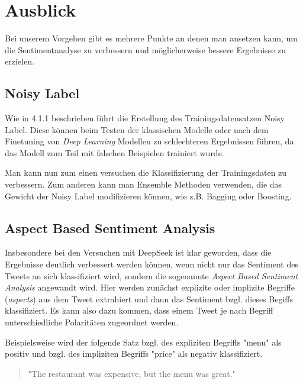 \section{Ausblick}


Bei unserem Vorgehen gibt es mehrere Punkte an denen man ansetzen kann, um die Sentimentanalyse zu verbessern und möglicherweise bessere Ergebnisse zu erzielen.

\subsection{Noisy Label}
Wie in 4.1.1 beschrieben führt die Erstellung des Trainingsdatensatzen Noisy Label. Diese können beim Testen der klassischen Modelle oder nach dem Finetuning von \textit{Deep Learning} Modellen zu schlechteren Ergebnissen führen, da das Modell zum Teil mit falschen Beispielen trainiert wurde. 

Man kann nun zum einen versuchen die Klassifizierung der Trainingsdaten zu verbessern.
Zum anderen kann man Ensemble Methoden verwenden, die das Gewicht der Noisy Label modifizieren können, wie z.B. Bagging oder Boosting.

\subsection{Aspect Based Sentiment Analysis}
Insbesondere bei den Versuchen mit DeepSeek ist klar geworden, dass die Ergebnisse deutlich verbessert werden können, wenn nicht nur das Sentiment des Tweets an sich klassifiziert wird, sondern die sogenannte \textit{Aspect Based Sentiment Analysis} angewandt wird. Hier werden zunächst explizite oder implizite Begriffe (\textit{aspects}) aus dem Tweet extrahiert und dann das Sentiment bzgl. dieses Begiffs klassifiziert.
Es kann also dazu kommen, dass einem Tweet je nach Begriff unterschiedliche Polaritäten zugeordnet werden.

Beispielsweise wird der folgende Satz bzgl. des expliziten Begriffs "menu" als positiv und bzgl. des impliziten Begriffs "price" als negativ klassifiziert. \cite{Hua_2024}
\begin{quote}
"The restaurant was expensive, but the menu was great." 
\end{quote}

